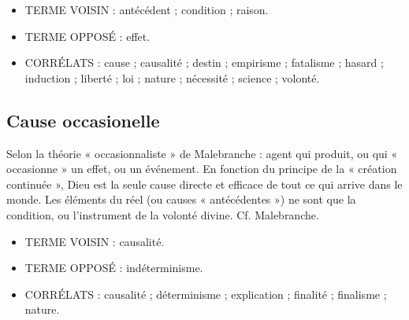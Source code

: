 \begin{itemize}[leftmargin=1cm, label=, itemsep=1pt]
\item {\footnotesize TERME VOISIN} : antécédent ;
condition ; raison.
\item {\footnotesize TERME OPPOSÉ} : effet.
\end{itemize}


\begin{itemize}[leftmargin=1cm, label=, itemsep=1pt]
\item {\footnotesize CORRÉLATS} : cause ; causalité ; destin ;  empirisme ;  fatalisme ; hasard ; induction ; liberté ; loi ; nature ; nécessité ; science ; volonté.
\end{itemize}

\subsection{Cause occasionelle}
Selon la théorie « occasionnaliste » de
Malebranche : agent qui produit, ou qui
« occasionne » un effet, ou un événement.
En fonction du principe de la
« création continuée », Dieu est la seule
cause directe et efficace de tout ce qui
arrive dans le monde. Les éléments du
réel (ou causes « antécédentes ») ne sont
que la condition, ou l'instrument de la
volonté divine. Cf. Malebranche.

\begin{itemize}[leftmargin=1cm, label=, itemsep=1pt]
\item {\footnotesize TERME VOISIN} : causalité.
\item {\footnotesize TERME OPPOSÉ} : indéterminisme.
\end{itemize}


\begin{itemize}[leftmargin=1cm, label=, itemsep=1pt]
\item {\footnotesize CORRÉLATS} : causalité ; déterminisme ;
explication ; finalité ; finalisme ; nature.
\end{itemize}


